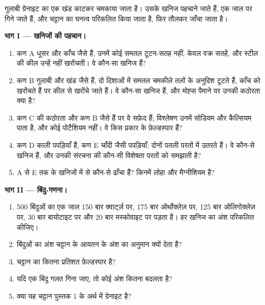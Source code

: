 \begin{problem}
\label{pb:g11:minerals:1}
गुलाबी ग्रेनाइट का एक खंड काटकर चमकाया जाता है। उसके खनिज पहचाने जाते हैं,
एक जाल पर गिने जाते हैं, और चट्टान का घनत्व परिकलित किया जाता है, फिर
तौलकर जाँचा जाता है।

\medskip
\noindent\textbf{भाग I --- खनिजों की पहचान।}
\begin{enumerate}
  \item कण A धूसर और काँच जैसे हैं, उनमें कोई समतल टूटन-सतह नहीं, केवल
        वक्र सतहें, और स्टील की कील उन्हें नहीं खरोंचती। वे कौन-सा खनिज
        हैं?
  \item कण B गुलाबी और खंड जैसे हैं, दो दिशाओं में समतल चमकीले तलों के अनुदिश
        टूटते हैं, काँच को खरोंचते हैं पर कील से खरोंचे जाते हैं। वे कौन-सा
        खनिज हैं, और मोह्स पैमाने पर उनकी कठोरता क्या है?
  \item कण C की कठोरता और  कण B जैसे हैं पर वे
        सफ़ेद हैं; विश्लेषण उनमें सोडियम और कैल्सियम पाता है, और कोई
        पोटैशियम नहीं। वे किस प्रकार के फ़ेल्डस्पार हैं?
  \item कण D काली पपड़ियाँ हैं, कण E चाँदी जैसी पपड़ियाँ; दोनों पतली
        परतों में उतरते हैं। वे कौन-से खनिज हैं, और उनकी संरचना की कौन-सी
        विशेषता परतों को समझाती है?
  \item A से E तक के खनिजों में से कौन-से ढाँचा  हैं? किनमें
        लोहा और मैग्नीशियम है?
\end{enumerate}

\medskip
\noindent\textbf{भाग II --- बिंदु-गणना।}
\begin{enumerate}[resume]
  \item 500 बिंदुओं का एक जाल 150 बार क्वार्ट्ज़ पर, 175 बार
        ऑर्थोक्लेज़ पर, 125 बार ऑलिगोक्लेज़ पर, 30 बार बायोटाइट पर और 20 बार
        मस्कोवाइट पर पड़ता है। हर खनिज का अंश परिकलित कीजिए।
  \item बिंदुओं का अंश चट्टान के आयतन के अंश का अनुमान क्यों
        देता है?
  \item चट्टान का कितना प्रतिशत फ़ेल्डस्पार है?
  \item यदि एक बिंदु गलत गिना जाए, तो कोई अंश कितना बदलता है?
  \item क्या यह चट्टान पुस्तक 1 के अर्थ में ग्रेनाइट है?
\end{enumerate}


\end{problem}
